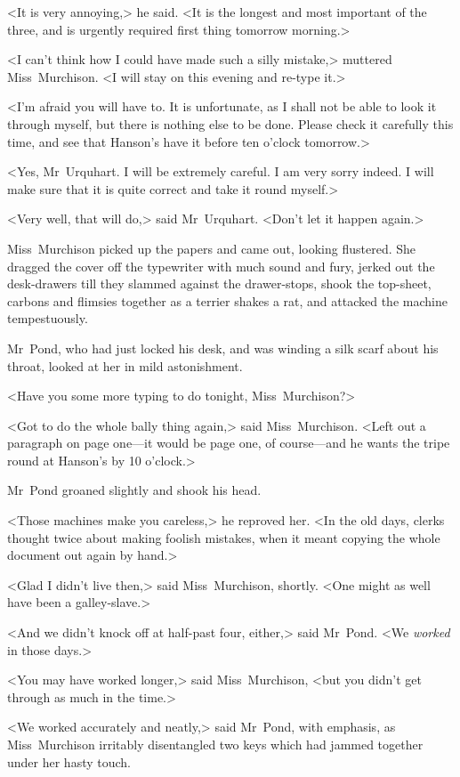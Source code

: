 <It is very annoying,> he said. <It is the longest and most important of the three, and is urgently required first thing tomorrow morning.>

<I can't think how I could have made such a silly mistake,> muttered Miss~Murchison. <I will stay on this evening and re-type it.>

<I'm afraid you will have to. It is unfortunate, as I shall not be able to look it through myself, but there is nothing else to be done. Please check it carefully this time, and see that Hanson's have it before ten o'clock tomorrow.>

<Yes, Mr~Urquhart. I will be extremely careful. I am very sorry indeed. I will make sure that it is quite correct and take it round myself.>

<Very well, that will do,> said Mr~Urquhart. <Don't let it happen again.>

Miss~Murchison picked up the papers and came out, looking flustered. She dragged the cover off the typewriter with much sound and fury, jerked out the desk-drawers till they slammed against the drawer-stops, shook the top-sheet, carbons and flimsies together as a terrier shakes a rat, and attacked the machine tempestuously.

Mr~Pond, who had just locked his desk, and was winding a silk scarf about his throat, looked at her in mild astonishment.

<Have you some more typing to do tonight, Miss~Murchison?>

<Got to do the whole bally thing again,> said Miss~Murchison. <Left out a paragraph on page one—it would be page one, of course—and he wants the tripe round at Hanson's by 10 o'clock.>

Mr~Pond groaned slightly and shook his head.

<Those machines make you careless,> he reproved her. <In the old days, clerks thought twice about making foolish mistakes, when it meant copying the whole document out again by hand.>

<Glad I didn't live then,> said Miss~Murchison, shortly. <One might as well have been a galley-slave.>

<And we didn't knock off at half-past four, either,> said Mr~Pond. <We \emph{worked} in those days.>

<You may have worked longer,> said Miss~Murchison, <but you didn't get through as much in the time.>

<We worked accurately and neatly,> said Mr~Pond, with emphasis, as Miss~Murchison irritably disentangled two keys which had jammed together under her hasty touch.

